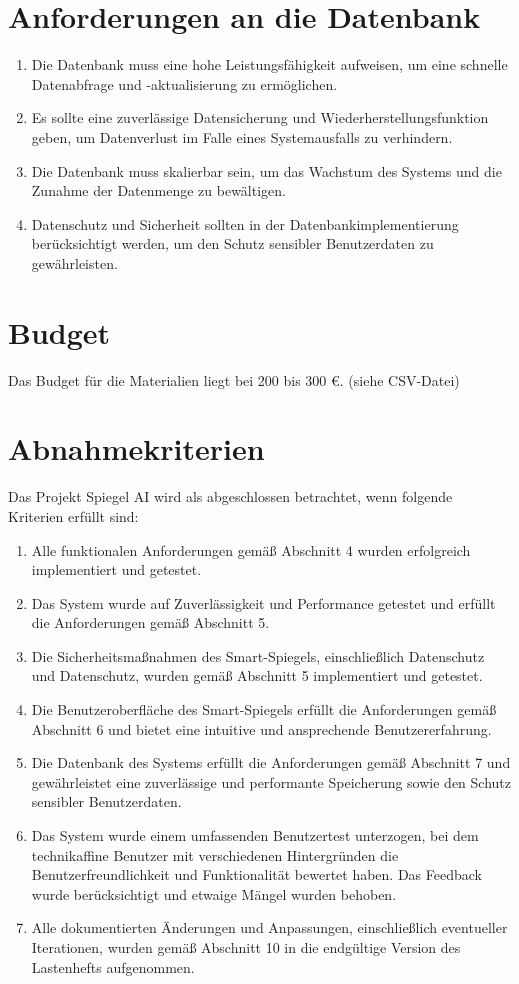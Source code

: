 \documentclass{article}
\begin{document}
\section{Anforderungen an die Datenbank}
\begin{enumerate}[label=\textbf{D\arabic*:}]
    \item Die Datenbank muss eine hohe Leistungsfähigkeit aufweisen, um eine schnelle Datenabfrage und -aktualisierung zu ermöglichen.
    \item Es sollte eine zuverlässige Datensicherung und Wiederherstellungsfunktion geben, um Datenverlust im Falle eines Systemausfalls zu verhindern.
    \item Die Datenbank muss skalierbar sein, um das Wachstum des Systems und die Zunahme der Datenmenge zu bewältigen.
    \item Datenschutz und Sicherheit sollten in der Datenbankimplementierung berücksichtigt werden, um den Schutz sensibler Benutzerdaten zu gewährleisten.
\end{enumerate}

\section{Budget}
Das Budget für die Materialien liegt bei 200 bis 300 €. (siehe CSV-Datei)

\section{Abnahmekriterien}
Das Projekt Spiegel AI wird als abgeschlossen betrachtet, wenn folgende Kriterien erfüllt sind:

\begin{enumerate}
    \item Alle funktionalen Anforderungen gemäß Abschnitt 4 wurden erfolgreich implementiert und getestet.
    \item Das System wurde auf Zuverlässigkeit und Performance getestet und erfüllt die Anforderungen gemäß Abschnitt 5.
    \item Die Sicherheitsmaßnahmen des Smart-Spiegels, einschließlich Datenschutz und Datenschutz, wurden gemäß Abschnitt 5 implementiert und getestet.
    \item Die Benutzeroberfläche des Smart-Spiegels erfüllt die Anforderungen gemäß Abschnitt 6 und bietet eine intuitive und ansprechende Benutzererfahrung.
    \item Die Datenbank des Systems erfüllt die Anforderungen gemäß Abschnitt 7 und gewährleistet eine zuverlässige und performante Speicherung sowie den Schutz sensibler Benutzerdaten.
    \item Das System wurde einem umfassenden Benutzertest unterzogen, bei dem technikaffine Benutzer mit verschiedenen Hintergründen die Benutzerfreundlichkeit und Funktionalität bewertet haben. Das Feedback wurde berücksichtigt und etwaige Mängel wurden behoben.
    \item Alle dokumentierten Änderungen und Anpassungen, einschließlich eventueller Iterationen, wurden gemäß Abschnitt 10 in die endgültige Version des Lastenhefts aufgenommen.
\end{enumerate}
\end{document}
